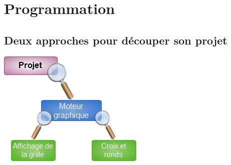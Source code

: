 
\section{Programmation}

\subsection{Deux approches pour découper son projet}
\begin{frame}
  \begin{center}
    \includegraphics[scale=0.6]{images/slide1.png}

  \end{center}
\end{frame}

